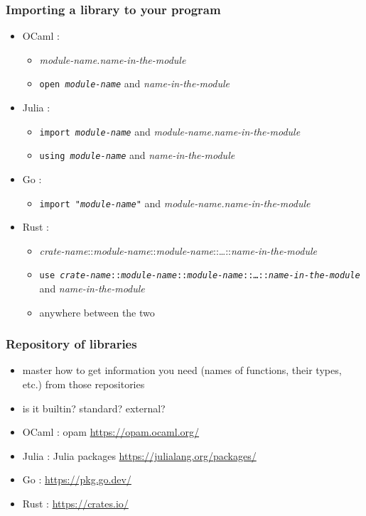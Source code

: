 \documentclass[12pt,dvipdfmx]{beamer}
\newcommand{\ao}[1]{{\color{blue}#1}}
\begin{document}
\begin{frame}
  \frametitle{Importing a library to your program}
  \begin{itemize}
  \item OCaml :
    \begin{itemize}
    \item {\it module-name.name-in-the-module} 
    \item {\tt \ao{open} {\it module-name}} and {\it name-in-the-module}
    \end{itemize}
    
  \item Julia : 
    \begin{itemize}
    \item {\tt \ao{import} {\it module-name}} and {\it module-name.name-in-the-module} 
    \item {\tt \ao{using} {\it module-name}} and {\it name-in-the-module}
    \end{itemize}

  \item Go :
    \begin{itemize}
    \item {\tt \ao{import} "{\it module-name}"} and {\it module-name.name-in-the-module} 
    \end{itemize}

  \item Rust : 
    \begin{itemize}
    \item {\it crate-name}::{\it module-name}::{\it module-name}::\ldots::{\it name-in-the-module}
    \item {\tt \ao{use} {\it crate-name}::{\it module-name}::{\it module-name}::\ldots::{\it name-in-the-module}} and \ao{\it name-in-the-module} 
    \item anywhere between the two
    \end{itemize}
  \end{itemize}
\end{frame}

\begin{frame}
  \frametitle{Repository of libraries}
  \begin{itemize}
  \item master how to get information you need
    (names of functions, their types, etc.) from those repositories
  \item is it builtin? standard? external?
  \end{itemize}
  
  \begin{itemize}
  \item OCaml : opam \url{https://opam.ocaml.org/}
  \item Julia : Julia packages \url{https://julialang.org/packages/}
  \item Go : \url{https://pkg.go.dev/}
  \item Rust : \url{https://crates.io/}
  \end{itemize}
\end{frame}
\end{document}
